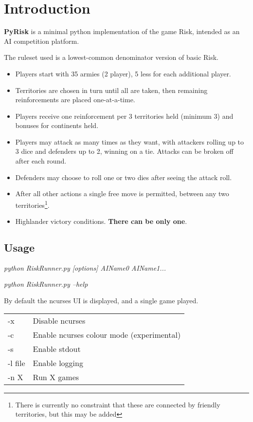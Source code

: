 \documentclass[12pt,a4paper]{article}
\begin{document}
\section{Introduction}

\textbf{PyRisk} is a minimal python implementation of the game Risk, intended as an AI competition platform.

The ruleset used is a lowest-common denominator version of basic Risk.
\begin{itemize}
\item Players start with 35 armies (2 player), 5 less for each additional player.
\item Territories are chosen in turn until all are taken, then remaining reinforcements are placed one-at-a-time.
\item Players receive one reinforcement per 3 territories held (minimum 3) and bonuses for continents held.
\item Players may attack as many times as they want, with attackers rolling up to 3 dice and defenders up to 2, winning on a tie. Attacks can be broken off after each round.
\item Defenders may choose to roll one or two dies after seeing the attack roll.
\item After all other actions a single free move is permitted, between any two territories\footnote{There is currently no constraint that these are connected by friendly territories, but this may be added}.
\item Highlander victory conditions. \textbf{There can be only one}.
\end{itemize}

\subsection{Usage}

\textit{python RiskRunner.py [options] AIName0 AIName1...}

\textit{python RiskRunner.py --help}

By default the ncurses UI is displayed, and a single game played.

\begin{tabular}{ll}
-x&Disable ncurses\\
-c&Enable ncurses colour mode (experimental)\\
-s&Enable stdout\\
-l file&Enable logging\\
-n X&Run X games\\
\end{tabular}
\end{document}
